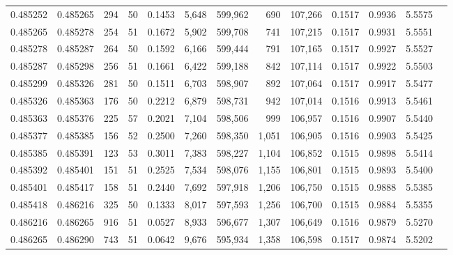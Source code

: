 \begin{tabular}{rrrrrrrrrrrrr}
0.485252 & 0.485265 & 294 &  50 &                                     0.1453 &   5,648 & 599,962 &     690 & 107,266 & 0.1517 & 0.9936 & 5.5575 \\
0.485265 & 0.485278 & 254 &  51 &                                     0.1672 &   5,902 & 599,708 &     741 & 107,215 & 0.1517 & 0.9931 & 5.5551 \\
0.485278 & 0.485287 & 264 &  50 &                                     0.1592 &   6,166 & 599,444 &     791 & 107,165 & 0.1517 & 0.9927 & 5.5527 \\
0.485287 & 0.485298 & 256 &  51 &                                     0.1661 &   6,422 & 599,188 &     842 & 107,114 & 0.1517 & 0.9922 & 5.5503 \\
0.485299 & 0.485326 & 281 &  50 &                                     0.1511 &   6,703 & 598,907 &     892 & 107,064 & 0.1517 & 0.9917 & 5.5477 \\
0.485326 & 0.485363 & 176 &  50 &                                     0.2212 &   6,879 & 598,731 &     942 & 107,014 & 0.1516 & 0.9913 & 5.5461 \\
0.485363 & 0.485376 & 225 &  57 &                                     0.2021 &   7,104 & 598,506 &     999 & 106,957 & 0.1516 & 0.9907 & 5.5440 \\
0.485377 & 0.485385 & 156 &  52 &                                     0.2500 &   7,260 & 598,350 &   1,051 & 106,905 & 0.1516 & 0.9903 & 5.5425 \\
0.485385 & 0.485391 & 123 &  53 &                                     0.3011 &   7,383 & 598,227 &   1,104 & 106,852 & 0.1515 & 0.9898 & 5.5414 \\
0.485392 & 0.485401 & 151 &  51 &                                     0.2525 &   7,534 & 598,076 &   1,155 & 106,801 & 0.1515 & 0.9893 & 5.5400 \\
0.485401 & 0.485417 & 158 &  51 &                                     0.2440 &   7,692 & 597,918 &   1,206 & 106,750 & 0.1515 & 0.9888 & 5.5385 \\
0.485418 & 0.486216 & 325 &  50 &                                     0.1333 &   8,017 & 597,593 &   1,256 & 106,700 & 0.1515 & 0.9884 & 5.5355 \\
0.486216 & 0.486265 & 916 &  51 &                                     0.0527 &   8,933 & 596,677 &   1,307 & 106,649 & 0.1516 & 0.9879 & 5.5270 \\
0.486265 & 0.486290 & 743 &  51 &                                     0.0642 &   9,676 & 595,934 &   1,358 & 106,598 & 0.1517 & 0.9874 & 5.5202 \\

\end{tabular}
